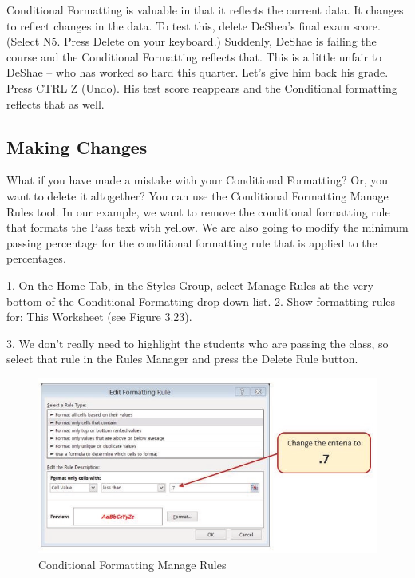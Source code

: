 Conditional Formatting is valuable in that it reflects the current data. It changes to reflect changes in
the data. To test this, delete DeShea’s final exam score. (Select N5. Press Delete on your keyboard.)
Suddenly, DeShae is failing the course and the Conditional Formatting reflects that. This is a little
unfair to DeShae – who has worked so hard this quarter. Let’s give him back his grade. Press CTRL Z
(Undo). His test score reappears and the Conditional formatting reflects that as well.

\subsection{Making Changes}

What if you have made a mistake with your Conditional Formatting? Or, you want to delete it
altogether? You can use the Conditional Formatting Manage Rules tool. In our example, we want
to remove the conditional formatting rule that formats the Pass text with yellow. We are also going
to modify the minimum passing percentage for the conditional formatting rule that is applied to the
percentages.

1. On the Home Tab, in the Styles Group, select Manage Rules at the very bottom of the
Conditional Formatting drop-down list.
2. Show formatting rules for: This Worksheet (see Figure 3.23).


3. We don’t really need to highlight the students who are passing the class, so select that rule in the
Rules Manager and press the Delete Rule button.


\begin{figure}[H]
	\centering
	\includegraphics[width=\maxwidth{.95\linewidth}]{gfx/ch03_fig23}
	\caption{Conditional Formatting Manage Rules}
	\label{03:fig23}
\end{figure}



